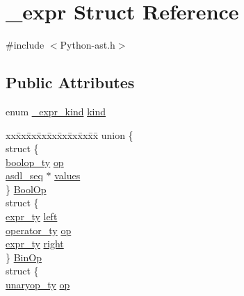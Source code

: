 \hypertarget{struct__expr}{}\section{\+\_\+expr Struct Reference}
\label{struct__expr}


{\ttfamily \#include $<$Python-\/ast.\+h$>$}

\subsection*{Public Attributes}
\begin{DoxyCompactItemize}
\item 
enum \mbox{\hyperlink{_python-ast_8h_a5040779a586bc1f6938f47df869170a5}{\+\_\+expr\+\_\+kind}} \mbox{\hyperlink{struct__expr_a588eb2205de8b0b03e0edd5143a26cd0}{kind}}
\item 
\begin{tabbing}
xx\=xx\=xx\=xx\=xx\=xx\=xx\=xx\=xx\=\kill
union \{\\
\>struct \{\\
\>\>\mbox{\hyperlink{_python-ast_8h_ab7ba8d66d81017932471af1f2609a830}{boolop\_ty}} \mbox{\hyperlink{struct__expr_a14d9cfe44b98767d7ca6ae45774a9e90}{op}}\\
\>\>\mbox{\hyperlink{structasdl__seq}{asdl\_seq}} $\ast$ \mbox{\hyperlink{struct__expr_ac1977025b175b8680fb3283b4881fdd4}{values}}\\
\>\} \mbox{\hyperlink{struct__expr_aa9cc1426a014c668556d1ea584837cca}{BoolOp}}\\
\>struct \{\\
\>\>\mbox{\hyperlink{_python-ast_8h_a56d3705e020a071405094a220c4592bd}{expr\_ty}} \mbox{\hyperlink{struct__expr_a57fda7bca80c71b8720b6e4ed6586bc0}{left}}\\
\>\>\mbox{\hyperlink{_python-ast_8h_a64ffe6085a53816a513038b9f1a04a9d}{operator\_ty}} \mbox{\hyperlink{struct__expr_adde80ab6d2230f82c89f4c9593489ca0}{op}}\\
\>\>\mbox{\hyperlink{_python-ast_8h_a56d3705e020a071405094a220c4592bd}{expr\_ty}} \mbox{\hyperlink{struct__expr_a710aaab4ce6f94cd332448a7e895111f}{right}}\\
\>\} \mbox{\hyperlink{struct__expr_a4cbecab88058a5bca34c881a2b484c06}{BinOp}}\\
\>struct \{\\
\>\>\mbox{\hyperlink{_python-ast_8h_a5a89f44a24bfbdb92d5a16b59468cffb}{unaryop\_ty}} \mbox{\hyperlink{struct__expr_a7483d09bf7d55490ce275f7e482744ed}{op}}\\

\end{tabbing}
\end{DoxyCompactItemize}
